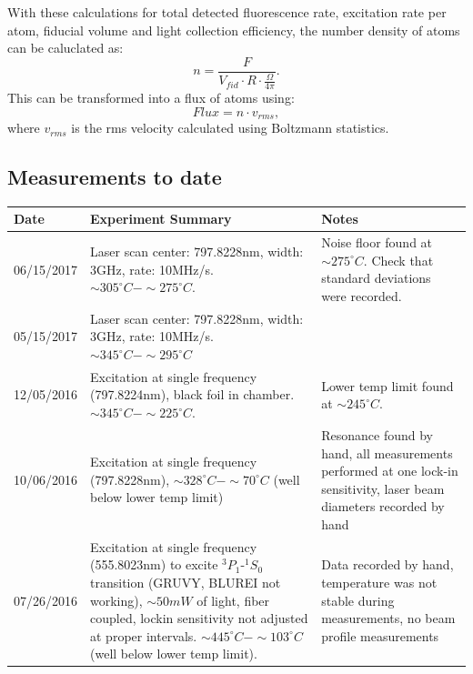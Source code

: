 \documentclass[12pt, a4paper]{article}
\begin{document}
With these calculations for total detected fluorescence rate, excitation rate per atom, fiducial volume and light collection efficiency, the number density of atoms can be caluclated as:
\begin{equation}
n = \frac{F}{V_{fid}\cdot R \cdot \frac{\Omega}{4\pi} }.
\end{equation}
This can be transformed into a flux of atoms using:
\begin{equation}
Flux = n\cdot v_{rms},
\end{equation}
where $v_{rms}$ is the rms velocity calculated using Boltzmann statistics.


\subsection{Measurements to date}
\begin{center}
\begin{table}[!h]
\begin{tabular}{||p{2cm}|p{8cm}|p{5cm}||}
\hline
Date & Experiment Summary & Notes\\
\hline\hline
06/15/2017 & Laser scan center: 797.8228nm, width: 3GHz, rate: 10MHz/s. $\sim305^{\circ}C-\sim275^{\circ}C$. &  Noise floor found at $\sim275^{\circ}C$. Check that standard deviations were recorded.\\
\hline
05/15/2017 & Laser scan center: 797.8228nm, width: 3GHz, rate: 10MHz/s. $\sim345^{\circ}C-\sim295^{\circ}C$ & \\
\hline 
12/05/2016 & Excitation at single frequency (797.8224nm), black foil in chamber. $\sim345^{\circ}C-\sim225^{\circ}C$. &  Lower temp limit found at $\sim245^{\circ}C$. \\
\hline
10/06/2016 & Excitation at single frequency (797.8228nm), $\sim328^{\circ}C-\sim70^{\circ}C$ (well below lower temp limit) & Resonance found by hand, all measurements performed at one lock-in sensitivity, laser beam diameters recorded by hand\\
\hline
07/26/2016 & Excitation at single frequency (555.8023nm) to excite $^{3}P_{1}$-$ ^{1}S_{0}$ transition (GRUVY, BLUREI not working), $\sim50mW$ of light, fiber coupled, lockin sensitivity not adjusted at proper intervals. $\sim445^{\circ}C-\sim103^{\circ}C$ (well below lower temp limit). & Data recorded by hand, temperature was not stable during measurements, no beam profile measurements\\
\hline
\end{tabular}
\end{table}
\end{center}
\end{document}

